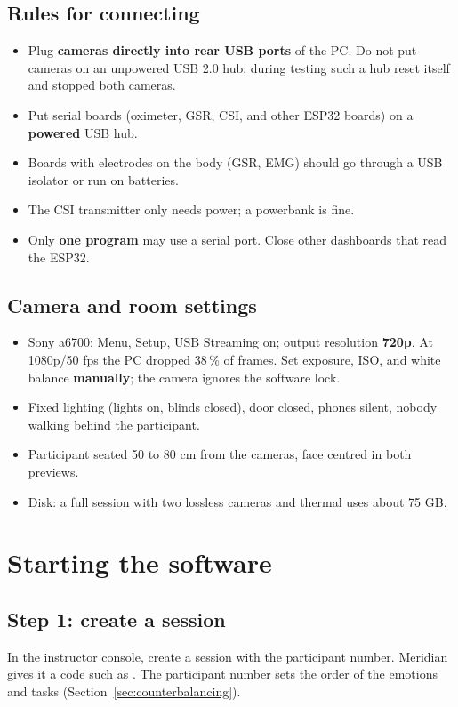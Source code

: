\documentclass[11pt,a4paper]{article}
\newcommand{\code}[1]{\texttt{\detokenize{#1}}}
\begin{document}
\subsection{Rules for connecting}
\begin{itemize}
  \item Plug \textbf{cameras directly into rear USB ports} of the PC. Do not put cameras on an unpowered USB 2.0 hub;
    during testing such a hub reset itself and stopped both cameras.
  \item Put serial boards (oximeter, GSR, CSI, and other ESP32 boards) on a \textbf{powered} USB hub.
  \item Boards with electrodes on the body (GSR, EMG) should go through a USB isolator or run on batteries.
  \item The CSI transmitter only needs power; a powerbank is fine.
  \item Only \textbf{one program} may use a serial port. Close other dashboards that read the ESP32.
\end{itemize}

\subsection{Camera and room settings}
\begin{itemize}
  \item Sony a6700: Menu, Setup, USB Streaming on; output resolution \textbf{720p}. At 1080p/50 fps the PC dropped
    38\,\% of frames. Set exposure, ISO, and white balance \textbf{manually}; the camera ignores the software lock.
  \item Fixed lighting (lights on, blinds closed), door closed, phones silent, nobody walking behind the participant.
  \item Participant seated 50 to 80 cm from the cameras, face centred in both previews.
  \item Disk: a full session with two lossless cameras and thermal uses about 75 GB.
\end{itemize}

\section{Starting the software}

\subsection{Step 1: create a session}
In the instructor console, create a session with the participant number. Meridian gives it a code such as
\code{9997VFQB}. The participant number sets the order of the emotions and tasks (Section~\ref{sec:counterbalancing}).
\end{document}

